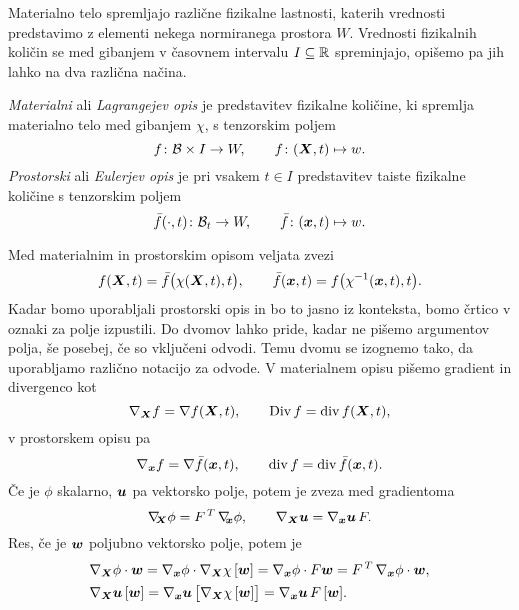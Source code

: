 Materialno telo spremljajo različne fizikalne lastnosti, katerih vrednosti predstavimo z elementi nekega
normiranega prostora $W$. Vrednosti fizikalnih količin
se med gibanjem v časovnem intervalu $I\subseteq\mathbb R$ spreminjajo, opišemo pa jih lahko na
dva različna načina.
\begin{definicija}
	\emph{Materialni} ali \emph{Lagrangejev opis} je predstavitev fizikalne količine, ki spremlja materialno telo
	med gibanjem $\chi$, s tenzorskim poljem
	\[ f\colon\mathcal B\times I \to W, \qquad f\colon (\boldsymbol X,t)\mapsto w. \]
	\emph{Prostorski} ali \emph{Eulerjev opis} je pri vsakem $t\in I$ predstavitev taiste fizikalne količine s tenzorskim poljem
	\[ \bar{f}(\cdot,t)\colon\mathcal B_t\to W, \qquad \bar{f}\colon (\boldsymbol x,t)\mapsto w. \]
\end{definicija}
Med materialnim in prostorskim opisom veljata zvezi
\begin{equation}\label{e:mpo-zveza}
	f(\boldsymbol X,t) = \bar{f}\big(\chi(\boldsymbol X,t),t\big),\qquad \bar{f}(\boldsymbol x,t) = f\big(\chi^{-1}(\boldsymbol x,t),t\big).
\end{equation}
Kadar bomo uporabljali prostorski opis in bo to jasno iz konteksta, bomo črtico v oznaki za polje izpustili.
Do dvomov lahko pride, kadar ne pišemo argumentov polja, še posebej, če so vključeni odvodi. Temu dvomu se izognemo tako,
da uporabljamo različno notacijo za odvode. V materialnem opisu pišemo gradient in divergenco kot
\[ \nabla_{\boldsymbol X}f=\nabla f(\boldsymbol X,t),\qquad \mathrm {Div}\, f = \mathrm{div}\, f(\boldsymbol X,t), \]
v prostorskem opisu pa
\[ \nabla_{\boldsymbol x}f=\nabla \bar{f}(\boldsymbol x,t),\qquad \mathrm{div}\, f = \mathrm{div}\, \bar{f}(\boldsymbol x,t). \]
Če je $\phi$ skalarno, $\boldsymbol u$ pa vektorsko polje, potem je zveza med gradientoma
\[
	\nabla_{\!\!\boldsymbol X}\phi=F^{\,T}\,\nabla_{\!\!\boldsymbol x}\phi,\qquad \nabla_{\boldsymbol X}\boldsymbol u=\nabla_{\boldsymbol x}\boldsymbol u\,F.
\]
Res, če je $\boldsymbol w$ poljubno vektorsko polje, potem je
\begin{align*}
	&\nabla_{\boldsymbol X}\phi\cdot\boldsymbol w=\nabla_{\boldsymbol x}\phi\cdot\nabla_{\boldsymbol X}\chi\,[\boldsymbol w]=
	\nabla_{\boldsymbol x}\phi\cdot F\boldsymbol w=F^{\,T}\,\nabla_{\boldsymbol x}\phi\cdot\boldsymbol w, \\
	&\nabla_{\boldsymbol X}\boldsymbol u\,[\boldsymbol w]=\nabla_{\boldsymbol x}\boldsymbol u\,\big[\nabla_{\boldsymbol X}\chi\,[\boldsymbol w]\big]
	=\nabla_{\boldsymbol x}\boldsymbol u\,F\,[\boldsymbol w].
\end{align*}

